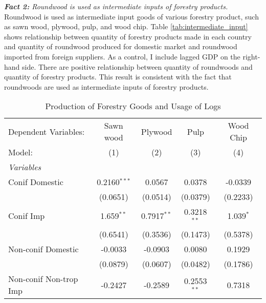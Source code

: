 \documentclass[a4paper,12pt]{article}
\begin{document}
\textit{\textbf{Fact 2:} Roundwood is used as intermediate inputs of forestry products.} \\
Roundwood is used as intermediate input goods of various forestry product, such as sawn wood, plywood, pulp, and wood chip. Table \ref{tab:intermediate_input} shows relationship between quantity of forestry products made in each country and quantity of roundwood produced for domestic market and roundwood imported from foreign suppliers. As a control, I include lagged GDP on the right-hand side. There are positive relationship between quantity of roundwoods and quantity of forestry products. This result is consistent with the fact that roundwoods are used as intermediate inputs of forestry products.\\

\begin{table}[htbp]
    \caption{Production of Forestry Goods and Usage of Logs}
    \centering
    \begin{tabular}{lcccc}
       \tabularnewline \midrule \midrule
       Dependent Variables:     & Sawn wood                    & Plywood                     & Pulp                    & Wood Chip\\  
       Model:                   & (1)                     & (2)                         & (3)                     & (4)\\  
       \midrule
       \emph{Variables}\\
       Conif Domestic          & 0.2160$^{***}$          & 0.0567                      & 0.0378                  & -0.0339\\   
                                & (0.0651)                & (0.0514)                    & (0.0379)                & (0.2233)\\   
       Conif Imp               & 1.659$^{**}$            & 0.7917$^{**}$               & 0.3218$^{**}$           & 1.039$^{*}$\\   
                                & (0.6541)                & (0.3536)                    & (0.1473)                & (0.5378)\\   
       Non-conif Domestic       & -0.0033                 & -0.0903                     & 0.0080                  & 0.1929\\   
                                & (0.0879)                & (0.0607)                    & (0.0482)                & (0.1786)\\   
     Non-conif Non-trop Imp   & -0.2427                 & -0.2589                     & 0.2553$^{**}$           & 0.7318\\   

\end{tabular}
\end{table}
\end{document}
